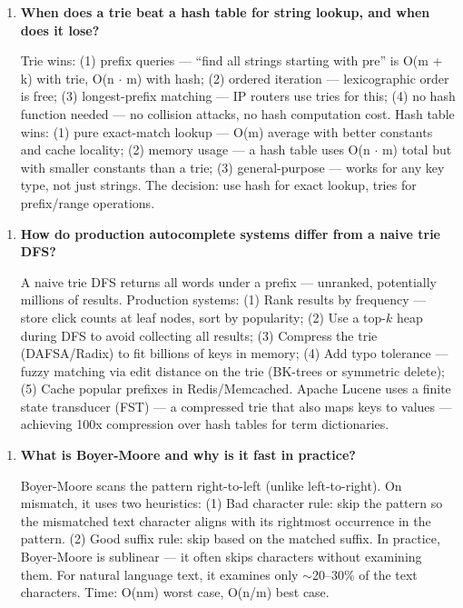 \begin{enumerate}
\item \textbf{When does a trie beat a hash table for string lookup, and when does it lose?}

Trie wins: (1) prefix queries --- ``find all strings starting with pre'' is O(m + k) with trie, O(n $\cdot$ m) with hash; (2) ordered iteration --- lexicographic order is free; (3) longest-prefix matching --- IP routers use tries for this; (4) no hash function needed --- no collision attacks, no hash computation cost. Hash table wins: (1) pure exact-match lookup --- O(m) average with better constants and cache locality; (2) memory usage --- a hash table uses O(n $\cdot$ m) total but with smaller constants than a trie; (3) general-purpose --- works for any key type, not just strings. The decision: use hash for exact lookup, tries for prefix/range operations.
\end{enumerate}

\begin{enumerate}
\item \textbf{How do production autocomplete systems differ from a naive trie DFS?}

A naive trie DFS returns all words under a prefix --- unranked, potentially millions of results. Production systems: (1) Rank results by frequency --- store click counts at leaf nodes, sort by popularity; (2) Use a top-$k$ heap during DFS to avoid collecting all results; (3) Compress the trie (DAFSA/Radix) to fit billions of keys in memory; (4) Add typo tolerance --- fuzzy matching via edit distance on the trie (BK-trees or symmetric delete); (5) Cache popular prefixes in Redis/Memcached. Apache Lucene uses a finite state transducer (FST) --- a compressed trie that also maps keys to values --- achieving 100x compression over hash tables for term dictionaries.
\end{enumerate}

\begin{enumerate}
\item \textbf{What is Boyer-Moore and why is it fast in practice?}

Boyer-Moore scans the pattern right-to-left (unlike left-to-right). On mismatch, it uses two heuristics: (1) Bad character rule: skip the pattern so the mismatched text character aligns with its rightmost occurrence in the pattern. (2) Good suffix rule: skip based on the matched suffix. In practice, Boyer-Moore is sublinear — it often skips characters without examining them. For natural language text, it examines only $\sim$20--30\% of the text characters. Time: O(nm) worst case, O(n/m) best case.
\end{enumerate}

